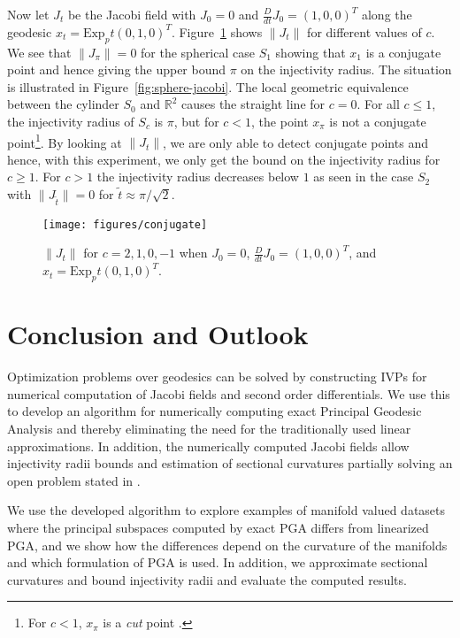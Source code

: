 \documentclass[final]{svjour3}
\newcommand{\RR}{\mathbb{R}}
\newcommand{\Df}[2]{\tfrac{D}{d#2} #1}
\newcommand{\Exp}{\mathrm{Exp}}
\begin{document}
Now let $J_t$ be the Jacobi field with $J_0=0$ and $\Df{J_0}{t}=(1,0,0)^T$ along the geodesic
$x_t=\Exp_pt(0,1,0)^T$. Figure~\ref{fig:conjugate} shows $\|J_t\|$ for different values of $c$.
We see that $\|J_\pi\|=0$ for the spherical case $S_1$ showing that $x_1$ is a conjugate point and
hence giving the upper bound $\pi$ on the injectivity radius.
The situation is illustrated in Figure~\ref{fig:sphere-jacobi}.
The local geometric equivalence between the cylinder $S_0$ and $\RR^2$ causes the
straight line for $c=0$. 
For all $c\le 1$, the injectivity radius of $S_c$ is $\pi$, but for $c<1$, the point $x_\pi$ 
is not a conjugate point\footnote{
For $c<1$, $x_\pi$ is a \emph{cut} point 
\cite[Chap.  13]{do_carmo_riemannian_1992}.
}. By looking at $\|J_t\|$, we are only able to detect
conjugate points and hence, with this experiment, we only get the bound on the injectivity radius for
$c\ge 1$. For $c>1$ the injectivity radius decreases below $1$ as seen in the
case $S_2$ with $\|J_{\tilde{t}}\|=0$ for $\tilde{t}\approx\pi/\sqrt{2}$.
\begin{figure}[t]
    \begin{center}
      \texttt{[image: figures/conjugate]}
    \end{center}
    \caption{$\|J_t\|$ for $c=2,1,0,-1$ when $J_0=0$, $\Df{J_0}{t}=(1,0,0)^T$, and $x_t=\Exp_pt(0,1,0)^T$.}
    \label{fig:conjugate}
\end{figure}

\section{Conclusion and Outlook}
Optimization problems over geodesics can be solved by constructing 
IVPs for numerical computation of Jacobi fields and second order differentials.
We use this to develop an algorithm for numerically computing exact Principal 
Geodesic Analysis and thereby eliminating the need for the traditionally
used linear approximations. In addition, the numerically computed Jacobi fields
allow injectivity radii bounds and estimation of sectional curvatures partially
solving an open problem stated in \cite{huckemann_intrinsic_2010}.

We use the developed algorithm to explore examples of manifold valued datasets where 
the principal subspaces computed by exact PGA differs from linearized PGA, and we show 
how the differences 
depend on the curvature of the manifolds and which 
formulation of PGA is used. In addition, we 
approximate sectional curvatures and bound injectivity radii and evaluate the
computed results.
\end{document}
